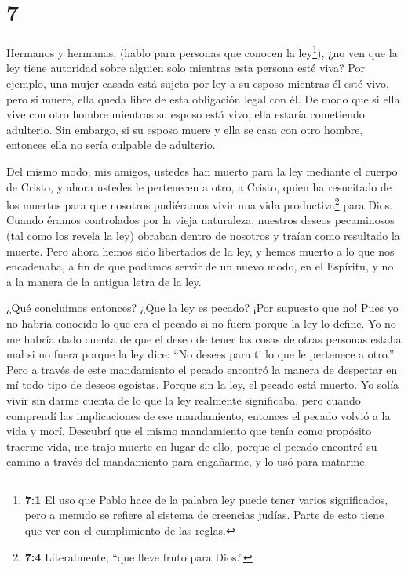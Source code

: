 \hypertarget{section-6}{%
\section{7}\label{section-6}}

 Hermanos y hermanas, (hablo para personas que conocen la
ley\footnote{\textbf{7:1} El uso que Pablo hace de la palabra ley puede
  tener varios significados, pero a menudo se refiere al sistema de
  creencias judías. Parte de esto tiene que ver con el cumplimiento de
  las reglas.}), ¿no ven que la ley tiene autoridad sobre alguien solo
mientras esta persona esté viva?  Por ejemplo, una mujer
casada está sujeta por ley a su esposo mientras él esté vivo, pero si
muere, ella queda libre de esta obligación legal con él.  De
modo que si ella vive con otro hombre mientras su esposo está vivo, ella
estaría cometiendo adulterio. Sin embargo, si su esposo muere y ella se
casa con otro hombre, entonces ella no sería culpable de adulterio.

 Del mismo modo, mis amigos, ustedes han muerto para la ley
mediante el cuerpo de Cristo, y ahora ustedes le pertenecen a otro, a
Cristo, quien ha resucitado de los muertos para que nosotros pudiéramos
vivir una vida productiva\footnote{\textbf{7:4} Literalmente, ``que
  lleve fruto para Dios.''} para Dios.  Cuando éramos
controlados por la vieja naturaleza, nuestros deseos pecaminosos (tal
como los revela la ley) obraban dentro de nosotros y traían como
resultado la muerte.  Pero ahora hemos sido libertados de la
ley, y hemos muerto a lo que nos encadenaba, a fin de que podamos servir
de un nuevo modo, en el Espíritu, y no a la manera de la antigua letra
de la ley.

 ¿Qué concluimos entonces? ¿Que la ley es pecado? ¡Por
supuesto que no! Pues yo no habría conocido lo que era el pecado si no
fuera porque la ley lo define. Yo no me habría dado cuenta de que el
deseo de tener las cosas de otras personas estaba mal si no fuera porque
la ley dice: ``No desees para ti lo que le pertenece a otro.''
 Pero a través de este mandamiento el pecado encontró la
manera de despertar en mí todo tipo de deseos egoístas. Porque sin la
ley, el pecado está muerto.  Yo solía vivir sin darme cuenta
de lo que la ley realmente significaba, pero cuando comprendí las
implicaciones de ese mandamiento, entonces el pecado volvió a la vida y
morí.  Descubrí que el mismo mandamiento que tenía como
propósito traerme vida, me trajo muerte en lugar de ello, 
porque el pecado encontró su camino a través del mandamiento para
engañarme, y lo usó para matarme.


